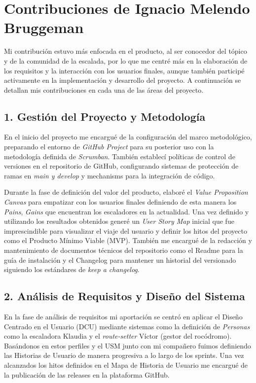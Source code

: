 \section*{Contribuciones de Ignacio Melendo Bruggeman}

Mi contribución estuvo más enfocada en el producto, al ser conocedor del tópico y de la comunidad de la escalada, por lo que me centré más en la elaboración de los requisitos y la interacción con los usuarios finales, aunque también participé activamente en la implementación y desarrollo del proyecto. A continuación se detallan mis contribuciones en cada una de las áreas del proyecto.

\subsection*{1. Gestión del Proyecto y Metodología}

En el inicio del proyecto me encargué de la configuración del marco metodológico, preparando el entorno de \textit{GitHub Project} para su posterior uso con la metodología definida de \textit{Scrumban}. También establecí políticas de control de versiones en el repositorio de GitHub, configurando sistemas de protección de ramas en \textit{main y develop} y mechanisms para la integración de código.

Durante la fase de definición del valor del producto, elaboré el \textit{Value Proposition Canvas} para empatizar con los usuarios finales definiendo de esta manera los \textit{Pains}, \textit{Gains} que encuentran los escaladores en la actualidad. Una vez definido y utilizando los resultados obtenidos generé un \textit{User Story Map} inicial que fue imprescindible para visualizar el viaje del usuario y definir los hitos del proyecto como el Producto Mínimo Viable (MVP). También me encargué de la redacción y mantenimiento de documentos técnicos del repositorio como el Readme para la guía de instalación y el Changelog para mantener un historial del versionado siguiendo los estándares de \textit{keep a changelog}.

\subsection*{2. Análisis de Requisitos y Diseño del Sistema}

En la fase de análisis de requisitos mi aportación se centró en aplicar el Diseño Centrado en el Usuario (DCU) mediante sistemas como la definición de \textit{Personas} como la escaladora Klaudia y el \textit{route-setter} Víctor (gestor del rocódromo). Basándonos en estos perfiles y el USM junto con mi compañero fuimos definiendo las Historias de Usuario de manera progresiva a lo largo de los sprints. Una vez alcanzados los hitos definidos en el Mapa de Historia de Usuario me encargué de la publicación de las releases en la plataforma GitHub.

